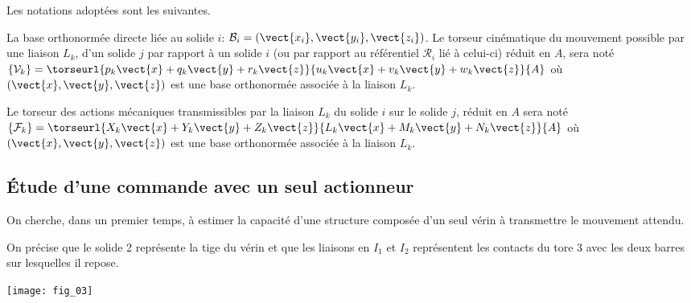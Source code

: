 Les notations adoptées sont les suivantes.

La base orthonormée directe liée au solide $i$: $\mathcal{B}_i = \left(\vect{x_i},\vect{y_i},\vect{z_i}\right)$. Le torseur cinématique du mouvement possible par une liaison $L_k$, d’un solide $j$ par rapport à un solide $i$
(ou par rapport au référentiel $\mathcal{R}_i$ lié à celui-ci) réduit en $A$, sera noté $\left\{ \mathcal{V}_k\right\}=\torseurl{p_k \vect{x}+q_k\vect{y}+r_k\vect{z}}{u_k \vect{x}+v_k\vect{y}+w_k\vect{z}}{A}$ où $\left(\vect{x},\vect{y},\vect{z}\right)$ est une base orthonormée associée à la liaison $L_k$. 

Le torseur des actions mécaniques transmissibles par la liaison $L_k$ du solide $i$ sur le solide $j$, réduit en $A$ sera noté $\left\{ \mathcal{F}_k\right\}=\torseurl{X_k \vect{x}+Y_k\vect{y}+Z_k\vect{z}}{L_k \vect{x}+M_k\vect{y}+N_k\vect{z}}{A}$ où $\left(\vect{x},\vect{y},\vect{z}\right)$ est une base orthonormée associée à la liaison $L_k$. 

\subsection*{Étude d'une commande avec un seul actionneur}

\begin{obj}
On cherche, dans un premier temps, à estimer la capacité d'une structure composée d'un seul vérin
à transmettre le mouvement attendu.
\end{obj}

On précise que le solide 2 représente la tige du vérin et que les liaisons en $I_1$ et $I_2$ représentent les contacts du
tore 3 avec les deux barres sur lesquelles il repose.

\begin{center}
\texttt{[image: fig\_03]}
\textit{}
\end{center}



